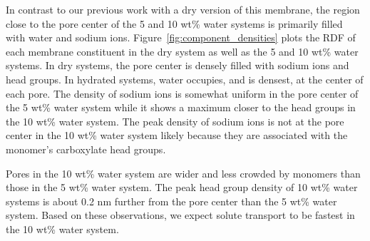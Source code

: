 \documentclass[journal=jpcbfk,manuscript=article]{achemso}
\begin{document}
  In contrast to our previous work with a dry version of this membrane, the 
  region close to the pore center of the 5 and 10 wt\% water systems is 
  primarily filled with water and sodium ions. Figure~\ref{fig:component_densities}
  plots the RDF of each membrane constituent in the dry system as well as the
  5 and 10 wt\% water systems. In dry systems, the pore center is densely 
  filled with sodium ions and head groups. In hydrated systems, water occupies, 
  and is densest, at the center of each pore. The density of sodium ions is 
  somewhat uniform in the pore center of the 5 wt\% water system while it shows
  a maximum closer to the head groups in the 10 wt\% water system. The peak 
  density of sodium ions is not at the pore center in the 10 wt\% water system
  likely because they are 
  associated with the monomer's carboxylate
  head groups.
  
  Pores in the 10 wt\% water system are wider and less crowded by monomers than
  those in the 5 wt\% water system. The peak head group density of 10 wt\% water
  systems is about 0.2 nm further from the pore center than the 5 wt\% water system. 
  Based on these observations, we expect solute transport to be fastest in the 
  10 wt\% water system.
  
\end{document}
